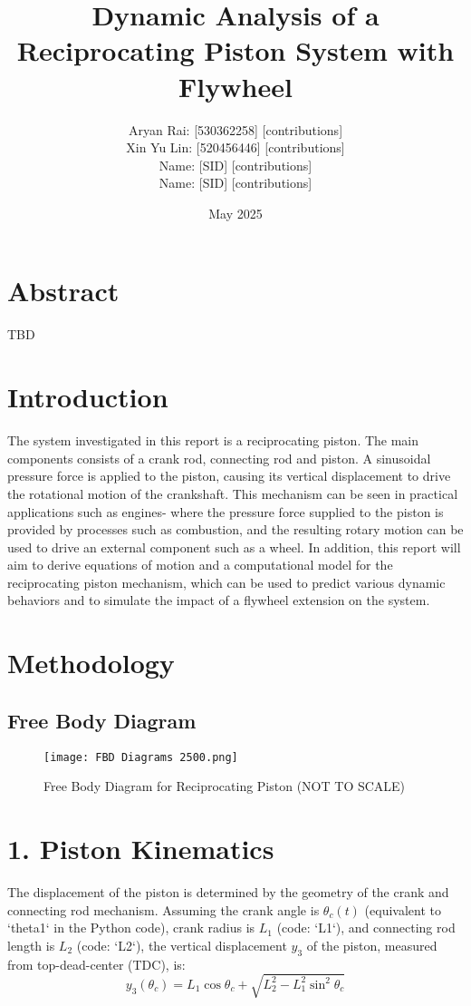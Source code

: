 \documentclass[12pt]{article}
\title{Dynamic Analysis of a Reciprocating Piston System with Flywheel}
\author{Aryan Rai: [530362258] [contributions] \\
        Xin Yu Lin: [520456446] [contributions]\\
        Name: [SID] [contributions]\\
        Name: [SID] [contributions]}
\date{May 2025}
\begin{document}
\maketitle

\section{Abstract}

TBD 


\section{Introduction}

The system investigated in this report is a reciprocating piston. The main components consists of a crank rod, connecting rod and piston. A sinusoidal pressure force is applied to the piston, causing its vertical displacement to drive the rotational motion of the crankshaft. This mechanism can be seen in practical applications such as engines- where the pressure force supplied to the piston is provided by processes such as combustion, and the resulting rotary motion can be used to drive an external component such as a wheel. In addition, this report will aim to derive equations of motion and a computational model for the reciprocating piston mechanism, which can be used to predict various dynamic behaviors and to simulate the impact of a flywheel extension on the system.  


\section{Methodology}

\subsection{Free Body Diagram}

\begin{figure}[H]
    \centering
    \texttt{[image: FBD Diagrams 2500.png]}
    \caption{Free Body Diagram for Reciprocating Piston (NOT TO SCALE)}
\end{figure}


\section*{1. Piston Kinematics}
The displacement of the piston is determined by the geometry of the crank and connecting rod mechanism. Assuming the crank angle is \(\theta_c(t)\) (equivalent to `theta1` in the Python code), crank radius is \(L_1\) (code: `L1`), and connecting rod length is \(L_2\) (code: `L2`), the vertical displacement \(y_3\) of the piston, measured from top-dead-center (TDC), is:
\begin{equation}
    y_3(\theta_c) = L_1 \cos\theta_c + \sqrt{L_2^2 - L_1^2 \sin^2\theta_c}
\end{equation}
\end{document}
